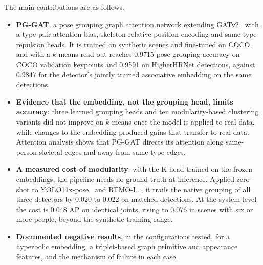 The main contributions are as follows.
\begin{itemize}
    \item \textbf{PG-GAT}, a pose grouping graph attention network extending GATv2~\citep{brody2022gatv2}
    with a type-pair attention bias, skeleton-relative position encoding and same-type repulsion heads.
    It is trained on synthetic scenes and fine-tuned on COCO, and with a $k$-means read-out
    reaches 0.9715 pose grouping accuracy on COCO validation keypoints
    and 0.9591 on HigherHRNet detections, against 0.9847 for the detector's jointly trained
    associative embedding on the same detections.
    \item \textbf{Evidence that the embedding, not the grouping head, limits accuracy}: three learned
    grouping heads and ten modularity-based clustering variants did not improve on $k$-means
    once the model is applied to real data, while changes to the embedding produced gains
    that transfer to real data. Attention analysis shows that PG-GAT directs its attention along
    same-person skeletal edges and away from same-type edges.
    \item \textbf{A measured cost of modularity}: with the K-head trained on the frozen embeddings,
    the pipeline needs no ground truth at inference. Applied zero-shot to YOLO11x-pose~\citep{ultralytics2024yolo11}
    and RTMO-L~\citep{lu2024rtmo}, it trails the native grouping of all three detectors
    by 0.020 to 0.022 on matched detections.
    At the system level the cost is 0.048 AP on identical joints,
    rising to 0.076 in scenes with six or more people, beyond the synthetic training range.
    \item \textbf{Documented negative results}, in the configurations tested,
    for a hyperbolic embedding, a triplet-based graph primitive and appearance features,
    and the mechanism of failure in each case.
\end{itemize}